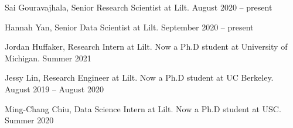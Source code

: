 
Sai Gouravajhala, Senior Research Scientist at Lilt. \hfill August 2020 -- present

Hannah Yan, Senior Data Scientist at Lilt. \hfill September 2020 -- present

Jordan Huffaker, Research Intern at Lilt. Now a Ph.D student at University of Michigan. \hfill Summer 2021

Jessy Lin, Research Engineer at Lilt. Now a Ph.D student at UC Berkeley. \hfill August 2019 -- August 2020

Ming-Chang Chiu, Data Science Intern at Lilt. Now a Ph.D student at USC. \hfill Summer 2020\\






